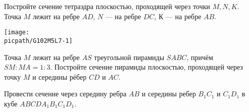 \begin{class}[number=7]
\begin{listofex}
		\item
		\begin{minipage}[t]{\bodywidth}
			Постройте сечение тетраэдра плоскостью, проходящей через точки \( M, N, K\). Точка \(M\) лежит на ребре \(AD\), \(N\) --- на ребре \(DC\), \(К\) --- на ребре \(AB\).
		\end{minipage}
		\begin{minipage}[t]{\picwidth}
			\texttt{[image: \\picpath/G102M5L7-1]}
		\end{minipage}
		\item Точка \(M\) лежит на ребре \(AS\) треугольной пирамиды \(SABC\), причём \(SM : MA = 1:3\). Постройте сечение пирамиды плоскостью, проходящей через точку \(M\) и середины рёбер \(CD\) и \(AC\).
		\item Провести сечение через середину ребра \(AB\) и середины ребер \(B_1C_1\) и \(C_1D_1\) в кубе \(ABCDA_1B_1C_1D_1\).
		
		
	\end{listofex}
\end{class}


